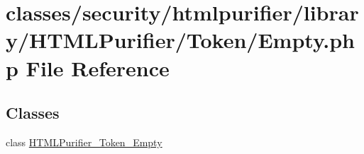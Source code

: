 \hypertarget{Token_2Empty_8php}{\section{classes/security/htmlpurifier/library/\+H\+T\+M\+L\+Purifier/\+Token/\+Empty.php File Reference}
\label{Token_2Empty_8php}
}
\subsection*{Classes}
\begin{DoxyCompactItemize}
\item 
class \hyperlink{classHTMLPurifier__Token__Empty}{H\+T\+M\+L\+Purifier\+\_\+\+Token\+\_\+\+Empty}
\end{DoxyCompactItemize}
